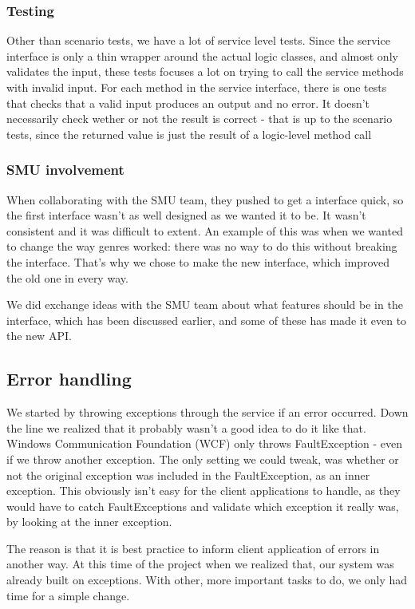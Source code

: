 \subsubsection{Testing}
Other than scenario tests, we have a lot of service level tests. Since the service interface is only a thin wrapper around the actual logic classes, and almost only validates the input, these tests focuses a lot on trying to call the service methods with invalid input. For each method in the service interface, there is one tests that checks that a valid input produces an output and no error. It doesn't necessarily check wether or not the result is correct - that is up to the scenario tests, since the returned value is just the result of a logic-level method call

\subsubsection{SMU involvement}
\label{Design_Service_Interface_SMU}
When collaborating with the SMU team, they pushed to get a interface quick, so the first interface wasn't as well designed as we wanted it to be. It wasn't consistent and it was difficult to extent. An example of this was when we wanted to change the way genres worked: there was no way to do this without breaking the interface. That's why we chose to make the new interface, which improved the old one in every way.

We did exchange ideas with the SMU team about what features should be in the interface, which has been discussed earlier, and some of these has made it even to the new API.

\subsection{Error handling}
\label{Implementation_Service_Error}

We started by throwing exceptions through the service if an error occurred. Down the line we realized that it probably wasn't a good idea to do it like that. Windows Communication Foundation (WCF) only throws FaultException - even if we throw another exception. The only setting we could tweak, was whether or not the original exception was included in the FaultException, as an inner exception. This obviously isn't easy for the client applications to handle, as they would have to catch FaultExceptions and validate which exception it really was, by looking at the inner exception.

The reason is that it is best practice to inform client application of errors in another way. At this time of the project when we realized that, our system was already built on exceptions. With other, more important tasks to do, we only had time for a simple change.

